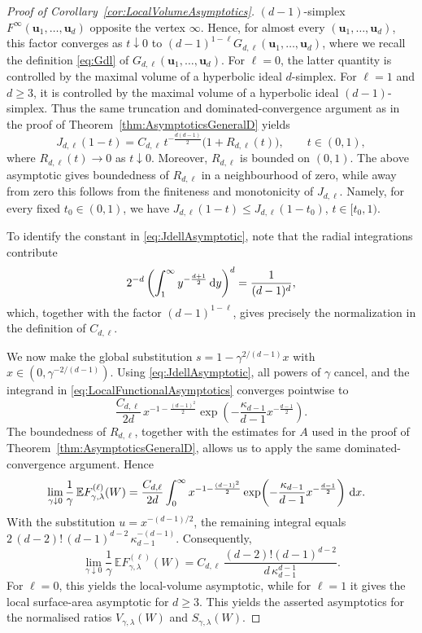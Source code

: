 \documentclass[11pt,a4paper]{article}
\theoremstyle{plain}
\theoremstyle{definition}
\theoremstyle{remark}
\newcommand{\dint}{\textup{d}}
\newcommand{\bu}{\boldsymbol{u}}
\def\EE{\mathbb{E}}
\begin{document}
\begin{proof}[Proof of Corollary~\ref{cor:LocalVolumeAsymptotics}]
	$(d-1)$-simplex $F^\infty(\bu_1,\ldots,\bu_d)$ opposite the
	vertex $\infty$. Hence, for almost every
	$(\bu_1,\ldots,\bu_d)$, this factor converges as
	$t\downarrow0$ to $(d-1)^{1-\ell}G_{d,\ell}(\bu_1,\ldots,\bu_d)$, where we recall the definition \eqref{eq:Gdl} of $G_{d,\ell}(\bu_1,\ldots,\bu_d)$. For $\ell=0$, the latter quantity is controlled by the maximal volume
	of a hyperbolic ideal $d$-simplex. For $\ell=1$ and $d\ge3$, it is
	controlled by the maximal volume of a hyperbolic ideal
	$(d-1)$-simplex. Thus the same truncation and dominated-convergence
	argument as in the proof of
	Theorem~\ref{thm:AsymptoticsGeneralD} yields
	\begin{equation}\label{eq:JdellAsymptotic}
		J_{d,\ell}(1-t)
		=
		C_{d,\ell}\,
		t^{-\frac{d(d-1)}2}
		\bigl(1+R_{d,\ell}(t)\bigr),
		\qquad t\in(0,1),
	\end{equation}
	where \(R_{d,\ell}(t)\to0\) as \(t\downarrow0\). Moreover,
	\(R_{d,\ell}\) is bounded on \((0,1)\). The above asymptotic gives
	boundedness of $R_{d,\ell}$ in a neighbourhood of zero, while away from zero this follows
	from the finiteness and monotonicity of \(J_{d,\ell}\). Namely, for every
	fixed \(t_0\in(0,1)\), we have $J_{d,\ell}(1-t)\le J_{d,\ell}(1-t_0)$, $t\in[t_0,1)$.

	To identify the constant in \eqref{eq:JdellAsymptotic}, note that the radial
	integrations contribute
	\[
		2^{-d}
		\left(
		\int_1^\infty y^{-\frac{d+1}{2}}\,\dint y
		\right)^d
		=
		\frac{1}{(d-1)^d},
	\]
	which, together with the factor $(d-1)^{1-\ell}$, gives precisely
	the normalization in the definition of $C_{d,\ell}$.

	We now make the global substitution $s=1-\gamma^{2/(d-1)}x$ with $x\in(0,\gamma^{-2/(d-1)})$.
	Using \eqref{eq:JdellAsymptotic}, all powers of $\gamma$ cancel, and
	the integrand in \eqref{eq:LocalFunctionalAsymptotics} converges
	pointwise to
	\[
		\frac{C_{d,\ell}}{2d}\,
		x^{-1-\frac{(d-1)^2}{2}}
		\exp\!\left(
		-\frac{\kappa_{d-1}}{d-1}
		x^{-\frac{d-1}{2}}
		\right).
	\]
	The boundedness of \(R_{d,\ell}\), together with the estimates for
	\(A\) used in the proof of Theorem~\ref{thm:AsymptoticsGeneralD},
	allows us to apply the same dominated-convergence argument.
	Hence
	\begin{align*}
		 & \lim_{\gamma\downarrow0}
		\frac{1}{\gamma}\,
		\EE F_{\gamma,\lambda}^{(\ell)}(W)
		=
		\frac{C_{d,\ell}}{2d}
		\int_0^\infty
		x^{-1-\frac{(d-1)^2}{2}}
		\exp\!\left(
		-\frac{\kappa_{d-1}}{d-1}
		x^{-\frac{d-1}{2}}
		\right)
		\,\dint x.
	\end{align*}
	With the substitution $u=x^{-(d-1)/2}$, the remaining integral
	equals $2\,(d-2)!\,(d-1)^{d-2}\,\kappa_{d-1}^{-(d-1)}$.
	Consequently,
	\[
		\lim_{\gamma\downarrow0}
		\frac{1}{\gamma}\,
		\EE F_{\gamma,\lambda}^{(\ell)}(W)
		=
		C_{d,\ell}\,
		\frac{(d-2)!(d-1)^{d-2}}{d\,\kappa_{d-1}^{d-1}}.
	\]
	For $\ell=0$, this yields the local-volume asymptotic, while for
	$\ell=1$ it gives the local surface-area asymptotic for $d\ge3$.
	This yields the asserted
	asymptotics for the normalised ratios
	$V_{\gamma,\lambda}(W)$ and
	$S_{\gamma,\lambda}(W)$.


\end{proof}
\end{document}
